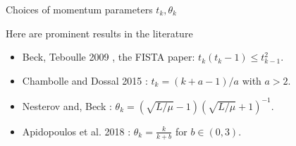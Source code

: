 \documentclass[11pt]{beamer}
\theoremstyle{definition}
\begin{document}
    \begin{frame}{Choices of momentum parameters $t_k, \theta_k$}
        \begin{block}{Here are prominent results in the literature}
            {\footnotesize
            \begin{itemize}
                \item Beck, Teboulle 2009 \cite[Theorem 4.4]{beck_fast_2009-1}, the FISTA paper: $t_k (t_k - 1) \le t_{k - 1}^2$. 
                \item Chambolle and Dossal 2015 \cite[Theorem 4.1]{chambolle_convergence_2015}: $t_k = (k + a -1)/a$ with $a > 2$. 
                \item Nesterov \cite[Theorem 2.2.3]{nesterov_lectures_2018} and, Beck \cite[Theorem 10.42]{beck_first-order_2017}
                : $\theta_k = \left(\sqrt{L/\mu} - 1\right)\left(\sqrt{L/\mu} + 1\right)^{-1}$.
                \item Apidopoulos et al. 2018 \cite{apidopoulos_convergence_2018}: $\theta_k = \frac{k}{k + b}$ for $b \in (0, 3)$. 
            \end{itemize}    
            }
        \end{block}
    \end{frame}
\end{document}
